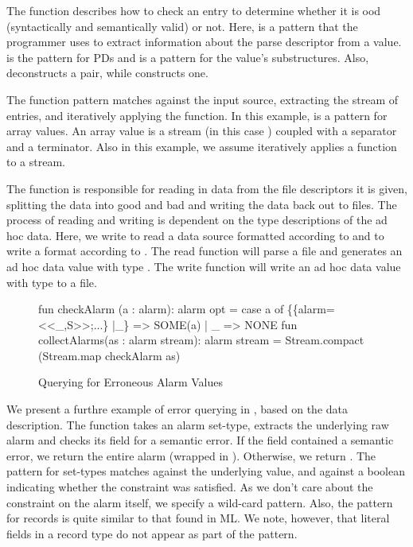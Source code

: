 \documentclass{entcs}
\begin{document}
The  function describes how to check an entry to
determine whether it is ood (syntactically and semantically
valid) or not.  Here,  is a pattern that the
programmer uses to extract information about the parse descriptor from
a value.   is the pattern for PDs and  is a pattern
for the value's substructures. Also,  deconstructs a pair,
while  constructs one.

The  function pattern matches against the input
source, extracting the stream of entries, and iteratively applying the
 function.  In this example, 
is a pattern for array values.  An array value is a stream (in this
case ) coupled with a separator and a terminator.  Also in
this example, we assume  iteratively applies a
function to a stream.  

The function  is responsible for reading in data from the file
descriptors it is given, splitting the data into good and bad and
writing the data back out to files.  The process of reading and
writing is dependent on the type descriptions of the ad hoc data.
Here, we write  to read a data source formatted according
to  and  to write a format according to .
The read function will parse a file and generates an ad hoc data value
with type .  The write function will write an ad hoc data value
with type  to a file.

\begin{figure}
  \centering
\begin{code}
fun checkAlarm (a : alarm): alarm opt =
    case a of 
	\{\{alarm=<<_,S>>;...\} |_\} => SOME(a)
      | _ => NONE
\mbox{}
fun collectAlarms(as : alarm stream): alarm stream =
    Stream.compact (Stream.map checkAlarm as)  
\end{code}
  \caption{Querying for Erroneous Alarm Values}
  \label{fig:ex-error-query}
\end{figure}

We present a furthre example of error querying in
, based on the \darkstar{} data
description. The function  takes an alarm set-type,
extracts the underlying raw alarm and checks its  field for
a semantic error.  If the  field contained a semantic error,
we return the entire alarm (wrapped in ). Otherwise, we
return . The pattern  for set-types
matches  against the underlying value, and  against
a boolean indicating whether the constraint was satisfied. As we don't
care about the constraint on the alarm itself, we specify a wild-card
pattern.  Also, the pattern for records is quite similar to that found
in ML. We note, however, that literal fields in a record type do not
appear as part of the pattern. 
\end{document}

